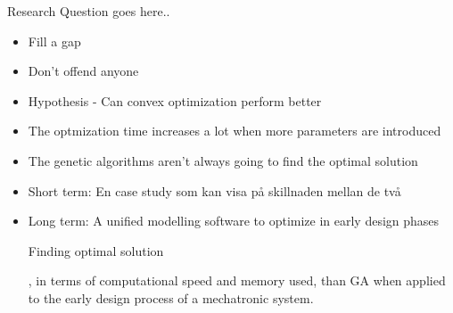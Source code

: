 Research Question goes here..

\begin{itemize}
\item Fill a gap
\item Don't offend anyone
\item Hypothesis - Can convex optimization perform better
\item The optmization time increases a lot when more parameters are introduced
\item The genetic algorithms aren't always going to find the optimal solution

\item Short term: En case study som kan visa på skillnaden mellan de två
\item Long term: A unified modelling software to optimize in early design phases

Finding optimal solution

, in terms of computational speed and memory used, than GA when applied to the early design process of a mechatronic system. 


\end{itemize}